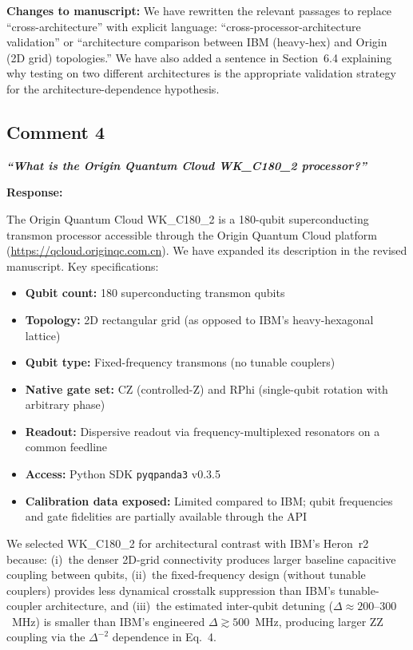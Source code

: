 \documentclass[11pt,a4paper]{article}
\begin{document}
\medskip\noindent\textbf{Changes to manuscript:} We have rewritten the relevant passages
to replace ``cross-architecture'' with explicit language: ``cross-processor-architecture
validation'' or ``architecture comparison between IBM (heavy-hex) and Origin (2D grid)
topologies.'' We have also added a sentence in Section~6.4 explaining why testing on two
different architectures is the appropriate validation strategy for the
architecture-dependence hypothesis.

\subsection*{Comment 4}

\noindent\textbf{\textit{``What is the Origin Quantum Cloud WK\_C180\_2 processor?''}}

\medskip\noindent\textbf{Response:}

The Origin Quantum Cloud WK\_C180\_2 is a 180-qubit superconducting transmon processor
accessible through the Origin Quantum Cloud platform (\url{https://qcloud.originqc.com.cn}).
We have expanded its description in the revised manuscript. Key specifications:

\begin{itemize}[leftmargin=*]
    \item \textbf{Qubit count:} 180 superconducting transmon qubits
    \item \textbf{Topology:} 2D rectangular grid (as opposed to IBM's heavy-hexagonal
    lattice)
    \item \textbf{Qubit type:} Fixed-frequency transmons (no tunable couplers)
    \item \textbf{Native gate set:} CZ (controlled-Z) and RPhi (single-qubit rotation
    with arbitrary phase)
    \item \textbf{Readout:} Dispersive readout via frequency-multiplexed resonators on a
    common feedline
    \item \textbf{Access:} Python SDK \texttt{pyqpanda3} v0.3.5
    \item \textbf{Calibration data exposed:} Limited compared to IBM; qubit frequencies
    and gate fidelities are partially available through the API
\end{itemize}

We selected WK\_C180\_2 for architectural contrast with IBM's Heron~r2 because:
(i)~the denser 2D-grid connectivity produces larger baseline capacitive coupling between
qubits, (ii)~the fixed-frequency design (without tunable couplers) provides less dynamical
crosstalk suppression than IBM's tunable-coupler architecture, and (iii)~the estimated
inter-qubit detuning ($\Delta \approx 200$--$300$~MHz) is smaller than IBM's engineered
$\Delta \gtrsim 500$~MHz, producing larger ZZ coupling via the $\Delta^{-2}$ dependence in
Eq.~4.
\end{document}
